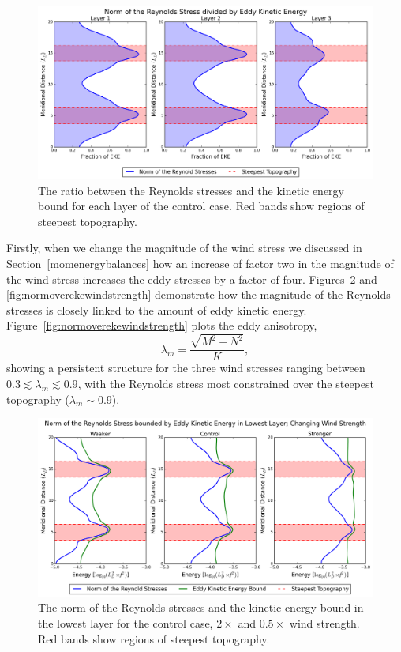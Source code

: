 \documentclass[12pt,a4paper]{report}
\newcommand*\figref[1]{Figure~\ref{#1}}
\newcommand*\secref[1]{Section~\ref{#1}}
\begin{document}
\begin{figure}
	\centering
	\includegraphics[width=\linewidth]{normovereke}
	\caption{The ratio between the Reynolds stresses and the kinetic energy bound for
		each layer of the control case.  Red bands show regions of steepest topography. }
	\label{fig:normovereke}
\end{figure}

Firstly, when we change the magnitude of the wind stress we discussed in 
\secref{momenergybalances} how an increase of factor two in the magnitude of the wind stress
increases the eddy stresses by a factor of four.  Figures~\ref{fig:ekeboundwindstrength}
and \ref{fig:normoverekewindstrength}
demonstrate how the magnitude of the Reynolds stresses is closely linked to the
amount of eddy kinetic energy. \figref{fig:normoverekewindstrength} plots the
eddy anisotropy,
\begin{equation}
\lambda_{m}=\frac{\sqrt{M^{2}+N^{2}}}{K},
\end{equation}
showing a persistent structure for the three wind stresses ranging between 
$0.3 \lesssim \lambda_{m} \lesssim 0.9$, with the Reynolds stress most constrained
over the steepest topography ($\lambda_{m} \sim 0.9$).


\begin{figure}
	\centering
	\includegraphics[width=\linewidth]{ekebound_0_1}
	\caption{ The norm of the Reynolds stresses and the kinetic energy bound in
		the lowest layer for the control case, $2\times$ and $0.5\times$ wind strength.  Red bands show regions of steepest topography.}
	\label{fig:ekeboundwindstrength}
\end{figure}
\end{document}
